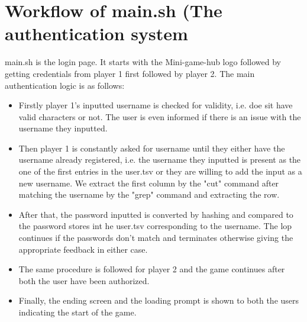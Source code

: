 \documentclass{article}
\begin{document}
\section{Workflow of main.sh (The authentication system}
main.sh is the login page. It starts with the Mini-game-hub logo followed by getting credentials from player 1 first followed by player 2. The main authentication logic is as follows:
\\
\begin{itemize}[leftmargin=1.5em, topsep=0pt, itemsep=0pt]
    \\
    \item Firstly player 1's inputted username is checked for validity, i.e. doe sit have valid characters or not. The user is even informed if there is an issue with the username they inputted. \\
    \item Then player 1 is constantly asked for username until they either have the username already registered, i.e. the username they inputted is present as the one of the first entries in the user.tsv or they are willing to add the input as a new username. We extract the first column by the "cut" command after matching the username by the "grep" command and extracting the row. \\
    \item After that, the password inputted  is converted by hashing and compared to the password stores int he user.tsv corresponding to the username. The lop continues if the passwords don't match and terminates otherwise giving the appropriate feedback in either case.
    \\
    \item The same procedure is followed for player 2 and the game continues after both the user have been authorized. 
    \\
    \item Finally, the ending screen and the loading prompt is shown to both the users indicating the start of the game. 
    \\
\end{itemize}



\newpage
\end{document}
